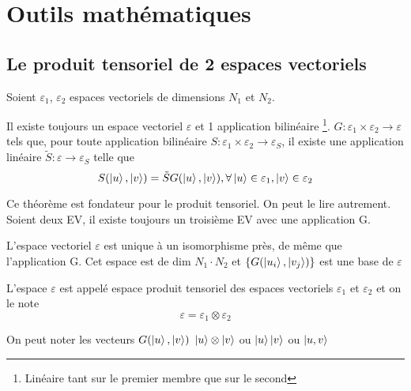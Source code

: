 \chapter{Outils mathématiques}
\section{Le produit tensoriel de 2 espaces vectoriels}

Soient $\varepsilon_1$, $\varepsilon_2$ espaces vectoriels de dimensions $N_1$ et $N_2$.

\begin{thm}
Il existe toujours un espace vectoriel $\varepsilon$ et 1 application bilinéaire \footnote{Linéaire tant sur le premier membre que sur le second}. $G: \varepsilon_1 \times \varepsilon_2 \rightarrow \varepsilon$ tels que, pour toute application bilinéaire $S: \varepsilon_1 \times \varepsilon_2 \rightarrow \varepsilon_S$, il existe une application linéaire $\tilde{S} : \varepsilon \rightarrow \varepsilon_S$ telle que 
$$ S(\ket{u},\ket{v})  = \tilde{S}G(\ket{u},\ket{v}), \forall \ket{u} \in \varepsilon_1,\ket{v} \in \varepsilon_2$$
\end{thm}
Ce théorème est fondateur pour le produit tensoriel. On peut le lire autrement. Soient deux EV, il existe toujours un troisième EV avec une application G.
\begin{thm}
	L'espace vectoriel $\varepsilon$ est unique à un isomorphisme près, de même que l'application G. Cet espace est de dim $N_1 \cdot N_2$ et $ \{ G(\ket{u_i},\ket{v_j}) \} $ est une base de $ \varepsilon $
\end{thm}

\begin{definition}
	L'espace $\varepsilon$ est appelé espace produit tensoriel des espaces vectoriels $\varepsilon_1$ et $\varepsilon_2$ et on le note
	$$ \varepsilon = \varepsilon_1 \otimes \varepsilon_2$$
\end{definition}

On peut noter les vecteurs $G(\ket{u},\ket{v})$ $\ket{u}\otimes\ket{v}$ ou $\ket{u}\ket{v}$ ou $\ket{u,v}$